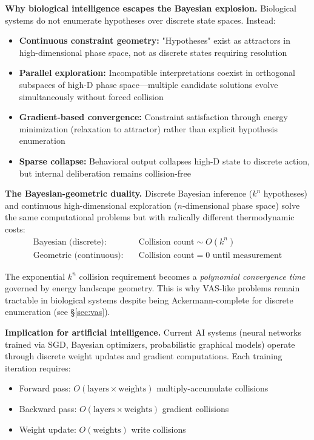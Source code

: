 \documentclass[12pt]{article}
\begin{document}
\textbf{Why biological intelligence escapes the Bayesian explosion.} Biological systems do not enumerate hypotheses over discrete state spaces. Instead:
\begin{itemize}
\item \textbf{Continuous constraint geometry:} "Hypotheses" exist as attractors in high-dimensional phase space, not as discrete states requiring resolution
\item \textbf{Parallel exploration:} Incompatible interpretations coexist in orthogonal subspaces of high-D phase space---multiple candidate solutions evolve simultaneously without forced collision
\item \textbf{Gradient-based convergence:} Constraint satisfaction through energy minimization (relaxation to attractor) rather than explicit hypothesis enumeration
\item \textbf{Sparse collapse:} Behavioral output collapses high-D state to discrete action, but internal deliberation remains collision-free
\end{itemize}

\textbf{The Bayesian-geometric duality.} Discrete Bayesian inference ($k^n$ hypotheses) and continuous high-dimensional exploration ($n$-dimensional phase space) solve the same computational problems but with radically different thermodynamic costs:
\begin{equation}
\begin{aligned}
\text{Bayesian (discrete):} \quad & \text{Collision count} \sim O(k^n) \\
\text{Geometric (continuous):} \quad & \text{Collision count} = 0 \text{ until measurement}
\end{aligned}
\end{equation}

The exponential $k^n$ collision requirement becomes a \textit{polynomial convergence time} governed by energy landscape geometry. This is why VAS-like problems remain tractable in biological systems despite being Ackermann-complete for discrete enumeration (see \S\ref{sec:vas}).

\textbf{Implication for artificial intelligence.} Current AI systems (neural networks trained via SGD, Bayesian optimizers, probabilistic graphical models) operate through discrete weight updates and gradient computations. Each training iteration requires:
\begin{itemize}
\item Forward pass: $O(\text{layers} \times \text{weights})$ multiply-accumulate collisions
\item Backward pass: $O(\text{layers} \times \text{weights})$ gradient collisions
\item Weight update: $O(\text{weights})$ write collisions
\end{itemize}
\end{document}
